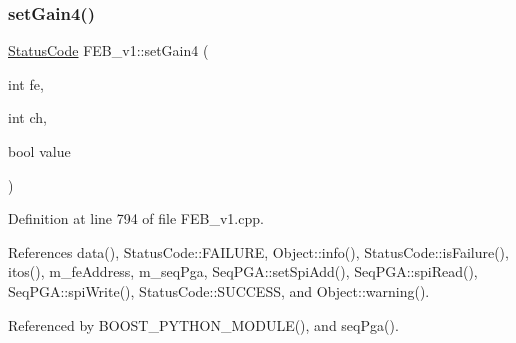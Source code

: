 \subsubsection{\texorpdfstring{set\+Gain4()}{setGain4()}}
{\footnotesize\ttfamily \hyperlink{classStatusCode}{Status\+Code} F\+E\+B\+\_\+v1\+::set\+Gain4 (\begin{DoxyParamCaption}\item[{int}]{fe,  }\item[{int}]{ch,  }\item[{bool}]{value }\end{DoxyParamCaption})}



Definition at line 794 of file F\+E\+B\+\_\+v1.\+cpp.



References data(), Status\+Code\+::\+F\+A\+I\+L\+U\+RE, Object\+::info(), Status\+Code\+::is\+Failure(), itos(), m\+\_\+fe\+Address, m\+\_\+seq\+Pga, Seq\+P\+G\+A\+::set\+Spi\+Add(), Seq\+P\+G\+A\+::spi\+Read(), Seq\+P\+G\+A\+::spi\+Write(), Status\+Code\+::\+S\+U\+C\+C\+E\+SS, and Object\+::warning().



Referenced by B\+O\+O\+S\+T\+\_\+\+P\+Y\+T\+H\+O\+N\+\_\+\+M\+O\+D\+U\+L\+E(), and seq\+Pga().



